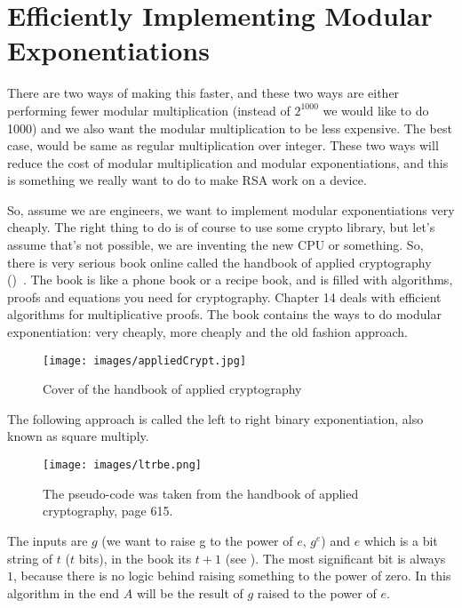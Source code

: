 \section{Efficiently Implementing Modular Exponentiations}\label{sec:Efficiently Implementing Modular Exponentiations}

There are two ways of making this faster, and these two ways are either
performing fewer modular multiplication (instead of  \( 2^{1000} \)  we would
like to do 1000) and we also want the modular multiplication to be less
expensive. The best case, would be same as regular multiplication over integer.
These two ways will reduce the cost of modular multiplication and modular
exponentiations, and this is something we really want to do to make RSA work on
a device.

So, assume we are engineers, we want to implement modular exponentiations very
cheaply. The right thing to do is of course to use some crypto library, but
let's assume that's not possible, we are inventing the new CPU or something. So,
there is very serious book online called the handbook of applied cryptography
()~\cite{katz1996handbook}. The book is like a phone book
or a recipe book, and is filled with algorithms, proofs and equations you need
for cryptography. Chapter 14 deals with efficient algorithms for multiplicative
proofs. The book contains the ways to do modular exponentiation: very cheaply,
more cheaply and the old fashion approach. 

\begin{figure}[!ht]
    \centering
    \texttt{[image: images/appliedCrypt.jpg]}
    \caption{Cover of the handbook of applied cryptography} \label{fig:appliedCrypt}
\end{figure}

The following approach is called the left to right binary exponentiation, also
known as square multiply.
\begin{figure}[!ht]
    \centering
    \texttt{[image: images/ltrbe.png]}
    \caption{The pseudo-code was taken from the handbook of applied cryptography, page 615.} \label{fig:ltrbe}
\end{figure}

The inputs are $g$ (we want to raise g to the power of $e$, \(g^e\)) and \(e\)
which is a bit string of $t$ ($t$ bits), in the book its $t+1$ (see
). The most significant bit is always $1$, because there is no
logic behind raising something to the power of zero. In this algorithm in the
end \(A\) will be the result of $g$ raised to the power of $e$. 

